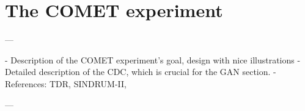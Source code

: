 \chapter{The COMET experiment}\label{chapter2}

\begin{markdown}
---

- Description of the COMET experiment's goal, design with nice illustrations
- Detailed description of the CDC, which is crucial for the GAN section.
- References: TDR, SINDRUM-II, 

---
\end{markdown}



